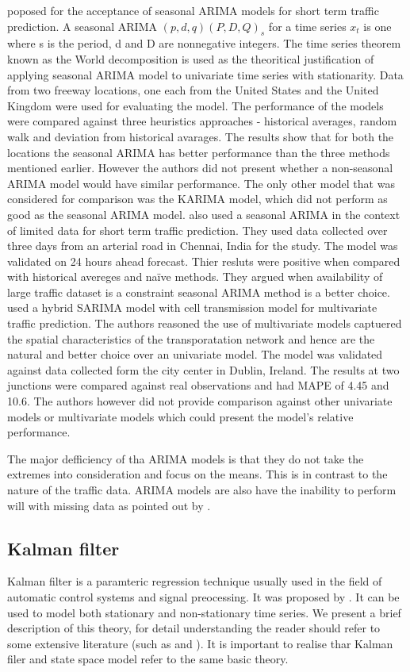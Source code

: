 \citet{williams2003modeling} poposed for the acceptance of seasonal ARIMA models for short term
traffic prediction. A seasonal ARIMA $(p,d,q) (P,D,Q)_{s}$ for a time series {$x_{t}$} is one
where s is the period, d and D are nonnegative integers. The time series theorem known as the World
decomposition is used as the theoritical justification of applying seasonal ARIMA model to
univariate time series with stationarity. Data from two freeway locations, one each from the
United States and the United Kingdom were used for evaluating the model. The performance of the
models were compared against three heuristics approaches - historical averages, random walk and
deviation from historical avarages. The results show that for both the locations the seasonal
ARIMA has better performance than the three methods mentioned earlier. However the authors did
not present whether a non-seasonal ARIMA model would have similar performance. The only other
model that was considered for comparison was the KARIMA model, which did not perform as good as
the seasonal ARIMA model. \citet{kumar2015short} also used a seasonal ARIMA in the context of
limited data for short term traffic prediction. They used data collected over three days from an
arterial road in Chennai, India for the study. The model was validated on 24 hours ahead forecast.
Thier resluts were positive when compared with historical avereges and naïve methods. They
argued when availability of large traffic dataset is a constraint seasonal ARIMA method is a
better choice. \citet{szeto2009multivariate} used a hybrid SARIMA model with cell transmission
model for multivariate traffic prediction. The authors reasoned the use of multivariate models
captuered the spatial characteristics of the transporatation network and hence are the natural
and better choice over an univariate model. The model was validated against data collected form
the city center in Dublin, Ireland. The results at two junctions were compared against real
observations and had MAPE of 4.45 and 10.6. The authors however did not provide comparison
against other univariate models or multivariate models which could present the model's relative
performance.

The major defficiency of tha ARIMA models is that they do not take the extremes into
consideration and focus on the means. This is in contrast to the nature of the traffic data.
ARIMA models are also have the inability to perform will with missing data as pointed out by
\citet{smith1997traffic}.


\subsection{Kalman filter}
Kalman filter is a paramteric regression technique usually used in the field of automatic control
systems and signal preocessing. It was proposed by \citet{kalman1960new}. It can be used to model
both stationary and non-stationary time series. We present a brief description of this theory, for
detail understanding the reader should refer to some extensive literature (such as
\citet{harvey1990forecasting}  and \citet{haykin2001kalman}). It is important to realise thar Kalman
filer and state space model refer to the same basic theory.


